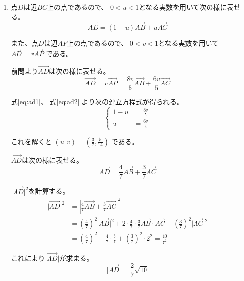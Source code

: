 \documentclass[12pt,b5paper]{ltjsarticle}
\begin{document}
\begin{enumerate}
      \hrulefill

 \item
      点$D$は辺$BC$上の点であるので、
      $0 < u < 1$となる実数を用いて次の様に表せる。
      \begin{equation}
       \overrightarrow{AD} = (1-u)\overrightarrow{AB} + u\overrightarrow{AC}
        \label{eq:ad1}
      \end{equation}


      また、点$D$は辺$AP$上の点であるので、
      $0 < v < 1$となる実数を用いて
      $\overrightarrow{AD} = v\overrightarrow{AP}$
      である。

      前問より$\overrightarrow{AD}$は次の様に表せる。
      \begin{equation}
       \overrightarrow{AD}
        = v\overrightarrow{AP}
        = \frac{8v}{5} \overrightarrow{AB} + \frac{6v}{5} \overrightarrow{AC}
        \label{eq:ad2}
      \end{equation}

      式\eqref{eq:ad1}、
      式\eqref{eq:ad2}
      より次の連立方程式が得られる。
      \begin{equation}
       \begin{cases}
        1-u &= \frac{8v}{5}\\
        u &= \frac{6v}{5}
       \end{cases}
      \end{equation}

      これを解くと
      $(u,v) = (\frac{3}{7}, \frac{5}{14})$
      である。

      $\overrightarrow{AD}$は次の様に表せる。
      \begin{equation}
       \overrightarrow{AD} = \frac{4}{7}\overrightarrow{AB} + \frac{3}{7}\overrightarrow{AC}
      \end{equation}

      $\lvert\overrightarrow{AD}\rvert^{2}$を計算する。
      \begin{align}
       \lvert \overrightarrow{AD} \rvert^{2}
        &= \left\lvert \frac{4}{7}\overrightarrow{AB}
       + \frac{3}{7}\overrightarrow{AC} \right\rvert^{2}\\
        &= \left(\frac{4}{7}\right)^{2} \lvert \overrightarrow{AB} \rvert^{2}
        + 2 \cdot \frac{4}{7} \cdot \frac{3}{7} \overrightarrow{AB} \cdot \overrightarrow{AC}
        + \left(\frac{3}{7}\right)^{2} \lvert \overrightarrow{AC} \rvert^{2}\\
        &= \left(\frac{4}{7}\right)^{2}
        - \frac{4}{7} \cdot \frac{3}{7}
        + \left(\frac{3}{7}\right)^{2} \cdot 2^{2}
        = \frac{40}{7^2}
      \end{align}

      これにより$\lvert\overrightarrow{AD}\rvert$が求まる。
      \begin{equation}
       \lvert\overrightarrow{AD}\rvert = \frac{2}{7}\sqrt{10}
      \end{equation}

\end{enumerate}
\hrulefill
\end{document}
